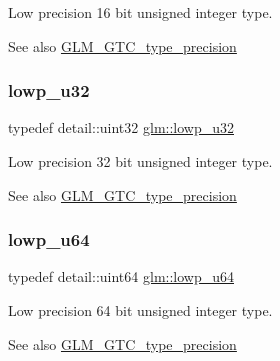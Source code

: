 Low precision 16 bit unsigned integer type. \begin{DoxySeeAlso}{See also}
\hyperlink{group__gtc__type__precision}{G\+L\+M\+\_\+\+G\+T\+C\+\_\+type\+\_\+precision} 
\end{DoxySeeAlso}
\mbox{\label{group__gtc__type__precision_gaba06fae1dd98ca50c017e68345df0365}} 
\subsubsection{\texorpdfstring{lowp\+\_\+u32}{lowp\_u32}}
{\footnotesize\ttfamily typedef detail\+::uint32 \hyperlink{group__gtc__type__precision_gaba06fae1dd98ca50c017e68345df0365}{glm\+::lowp\+\_\+u32}}

Low precision 32 bit unsigned integer type. \begin{DoxySeeAlso}{See also}
\hyperlink{group__gtc__type__precision}{G\+L\+M\+\_\+\+G\+T\+C\+\_\+type\+\_\+precision} 
\end{DoxySeeAlso}
\mbox{\label{group__gtc__type__precision_ga61ed4c68a4cffb77cd63cc107119123a}} 
\subsubsection{\texorpdfstring{lowp\+\_\+u64}{lowp\_u64}}
{\footnotesize\ttfamily typedef detail\+::uint64 \hyperlink{group__gtc__type__precision_ga61ed4c68a4cffb77cd63cc107119123a}{glm\+::lowp\+\_\+u64}}

Low precision 64 bit unsigned integer type. \begin{DoxySeeAlso}{See also}
\hyperlink{group__gtc__type__precision}{G\+L\+M\+\_\+\+G\+T\+C\+\_\+type\+\_\+precision} 
\end{DoxySeeAlso}
\mbox{\label{group__gtc__type__precision_gae63f942c49a30dbf266b2f13f3efe257}} 
